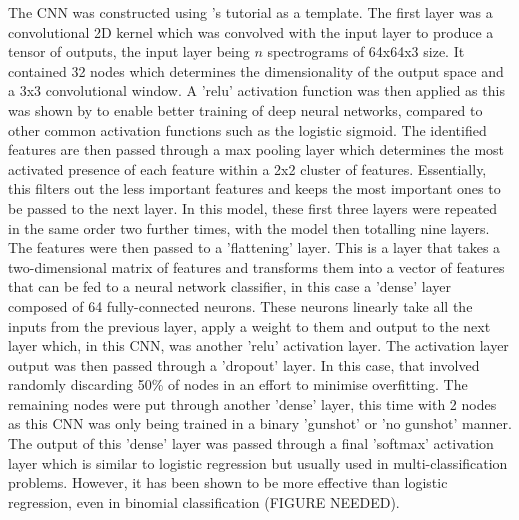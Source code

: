 The CNN was constructed using \cite{Chollet2016}'s tutorial as a template. The first layer was a convolutional 2D kernel which was convolved with the input layer to produce a tensor of outputs, the input layer being $n$ spectrograms of 64x64x3 size. It contained 32 nodes which determines the dimensionality of the output space and a 3x3 convolutional window. A 'relu' activation function was then applied as this was shown by \cite{Glorot2011} to enable better training of deep neural networks, compared to other common activation functions such as the logistic sigmoid. The identified features are then passed through a max pooling layer which determines the most activated presence of each feature within a 2x2 cluster of features. Essentially, this filters out the less important features and keeps the most important ones to be passed to the next layer. In this model, these first three layers were repeated in the same order two further times, with the model then totalling nine layers. The features were then passed to a 'flattening' layer. This is a layer that takes a two-dimensional matrix of features and transforms them into a vector of features that can be fed to a neural network classifier, in this case a 'dense' layer composed of 64 fully-connected neurons. These neurons linearly take all the inputs from the previous layer, apply a weight to them and output to the next layer which, in this CNN, was another 'relu' activation layer. The activation layer output was then passed through a 'dropout' layer. In this case, that involved randomly discarding 50\% of nodes in an effort to minimise overfitting. The remaining nodes were put through another 'dense' layer, this time with 2 nodes as this CNN was only being trained in a binary 'gunshot' or 'no gunshot' manner. The output of this 'dense' layer was passed through a final 'softmax' activation layer which is similar to logistic regression but usually used in multi-classification problems. However, it has been shown to be more effective than logistic regression, even in binomial classification (FIGURE NEEDED).

